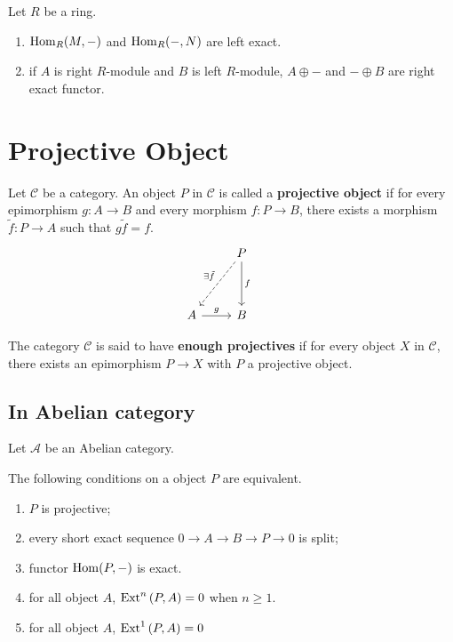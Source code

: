 \documentclass[12pt, oneside]{book}
\begin{document}
\begin{proposition}
    Let $R$ be a ring.
    \begin{enumerate}
        \item
              $\operatorname{\operatorname{Hom}}_R(M,-)$ and $\operatorname{\operatorname{Hom}}_R(-,N)$ are left exact.
        \item
              if $A$ is right $R$-module and $B$ is left $R$-module,  $A \oplus -$ and $- \oplus B$ are right exact functor.
    \end{enumerate}
\end{proposition}





\section{Projective Object} %
\begin{definition}
    Let $\mathcal{C}$ be a category.
    An object $P$ in $\mathcal{C}$ is called a \textbf{projective object} if for every epimorphism $g:A\rightarrow B$ and every morphism $f:P\rightarrow B$, there exists a morphism $\tilde{f}:P\rightarrow A$ such that $g\tilde{f}=f$.
    \begin{equation*}
        \begin{tikzcd}
            & P \arrow[ldd,dashed," \exists \tilde{f}"'] \arrow[dd,"f"] & \\
            & & \\
            A \arrow[r,"g"]& B &
        \end{tikzcd}
    \end{equation*}
\end{definition}

\begin{definition}
    The category $\mathcal{C}$ is said to have \textbf{enough projectives} if for every object $X$ in $\mathcal{C}$, there exists an epimorphism $P \rightarrow X$ with $P$ a projective object.
\end{definition}

\subsection{In Abelian category} %
Let $\mathcal{A}$ be an Abelian category.
\begin{theorem}
    The following conditions on a object $P$ are equivalent.
    \begin{enumerate}
        \item
              $P$ is projective;

        \item
              every short exact sequence $0 \rightarrow A \rightarrow B \rightarrow P \rightarrow 0$ is split;
        \item
              functor $\operatorname{\operatorname{Hom}}(P,-)$ is exact.
        \item
              for all object $A$, $\operatorname{\operatorname{Ext}}^n\left(P,A\right) = 0$ when $n\geq 1$.
        \item
              for all object $A$, $\operatorname{\operatorname{Ext}}^1\left(P,A\right) = 0$
    \end{enumerate}
\end{theorem}
\end{document}
